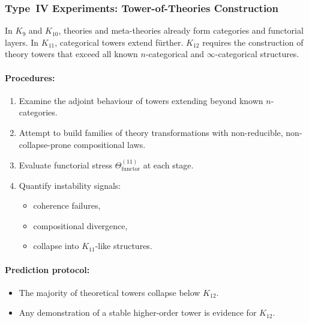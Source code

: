 \subsubsection{Type~IV Experiments: Tower-of-Theories Construction}

In $K_{9}$ and $K_{10}$, theories and meta-theories already form
categories and functorial layers.
In $K_{11}$, categorical towers extend fürther.
$K_{12}$ requires the construction of theory towers that exceed all
known $n$-categorical and $\infty$-categorical structures.

\paragraph{Procedures:}

\begin{enumerate}
    \item Examine the adjoint behaviour of towers extending beyond
          known $n$-categories.
    \item Attempt to build families of theory transformations with
          non-reducible, non-collapse-prone compositional laws.
    \item Evaluate functorial stress
          $\Theta_{\mathrm{functor}}^{(11)}$ at each stage.
    \item Quantify instability signals:
          \begin{itemize}
              \item coherence failures,
              \item compositional divergence,
              \item collapse into $K_{11}$-like structures.
          \end{itemize}
\end{enumerate}

\paragraph{Prediction protocol:}

\begin{itemize}
    \item The majority of theoretical towers collapse below $K_{12}$.
    \item Any demonstration of a stable higher-order tower is evidence
          for $K_{12}$.
\end{itemize}



